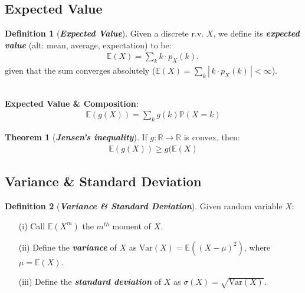 \documentclass[12pt]{extarticle}
\newcommand{\pstart}[0]{\noindent}
\newcommand{\term}[1]{\textbf{\textit{#1}}}
\theoremstyle{definition}
\newtheorem*{definition}{Definition}
\newtheorem*{theorem}{Theorem}
\theoremstyle{remark}
\newcommand{\prob}[1]{\mathbb{P}\left(#1\right)}
\newcommand{\expected}[1]{\mathbb{E}\left(#1\right)}
\newcommand{\variance}[1]{\text{Var}\left(#1\right)}
\begin{document}
\subsection{Expected Value}
\begin{tcolorbox}[colback=blue!10!white]
    \begin{definition}[\term{Expected Value}]
        Given a discrete r.v. $X$, we define its \term{expected value} 
(alt: mean, average, expectation) to be: \begin{align*}
            \expected{X}=\sum_kk\cdot p_X(k),
        \end{align*}
        given that the sum converges absolutely 
($\expected{X}=\sum_k|\,k\cdot p_X(k)\,|<\infty$).
    \end{definition}
\end{tcolorbox}

~\\ \pstart
\textbf{Expected Value \& Composition}: \begin{align*}
    \expected{g(X)}=\sum_{k}g(k)\prob{X=k}
\end{align*}

\begin{theorem}[\term{Jensen's inequality}]
    If $g:\mathbb{R}\to\mathbb{R}$ is convex, then: \begin{align*}
        \expected{g(X)}\geq g(\expected{X}
    \end{align*}
\end{theorem}

\pagebreak
\subsection{Variance \& Standard Deviation}
\begin{tcolorbox}
    \begin{definition}[\term{Variance \& Standard Deviation}]
        Given random variable $X$: \begin{enumerate}
            \item[(i)]  Call $\expected{X^m}$ the $m^{th}$ moment of $X$.
            \item[(ii)] Define the \term{variance} of $X$ as 
$\variance{X}=\expected{(X-\mu)^2}$, where $\mu=\expected{X}$.
            \item[(iii)] Define the \term{standard deviation} of $X$ as 
$\sigma(X)=\sqrt{\variance{X}}$.
        \end{enumerate}
    \end{definition}
\end{tcolorbox}
\end{document}
